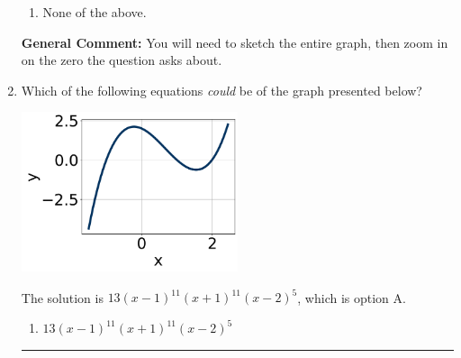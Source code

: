 \documentclass{extbook}[14pt]
\newcommand{\litem}[1]{\item #1

\rule{\textwidth}{0.4pt}}
\begin{document}
\begin{enumerate}
{\begin{enumerate}[label=\Alph*.]
\item None of the above.\end{enumerate}
\textbf{General Comment:} You will need to sketch the entire graph, then zoom in on the zero the question asks about.
}
\litem{
Which of the following equations \textit{could} be of the graph presented below?

\begin{center}
    \includegraphics[width=0.5\textwidth]{../Figures/polyGraphToFunctionCopyB.png}
\end{center}


The solution is \( 13(x - 1)^{11} (x + 1)^{11} (x - 2)^{5} \), which is option A.\begin{enumerate}[label=\Alph*.]
\item \( 13(x - 1)^{11} (x + 1)^{11} (x - 2)^{5} \)


\end{enumerate}}
\end{enumerate}
\end{document}
